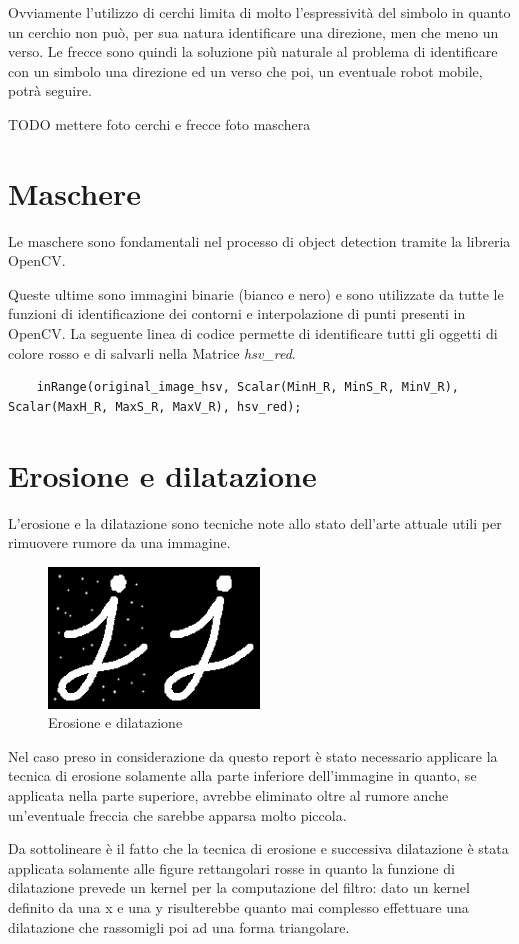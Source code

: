 Ovviamente l'utilizzo di cerchi limita di molto l'espressività del simbolo in quanto un cerchio non può, per sua natura identificare una direzione, men che meno un verso.
Le frecce sono quindi la soluzione più naturale al problema di identificare con un simbolo una direzione ed un verso che poi, un eventuale robot mobile, potrà seguire.

TODO mettere foto cerchi e frecce
foto maschera

\section{Maschere}
Le maschere sono fondamentali nel processo di object detection tramite la libreria OpenCV.

Queste ultime sono immagini binarie (bianco e nero) e sono utilizzate da tutte le funzioni di identificazione dei contorni e interpolazione di punti presenti in OpenCV.
La seguente linea di codice permette di identificare tutti gli oggetti di colore rosso e di salvarli nella Matrice \textit{hsv\_red}.

\begin{lstlisting}
	inRange(original_image_hsv, Scalar(MinH_R, MinS_R, MinV_R), Scalar(MaxH_R, MaxS_R, MaxV_R), hsv_red);
\end{lstlisting}



\section{Erosione e dilatazione}
L'erosione e la dilatazione sono tecniche note allo stato dell'arte attuale utili per rimuovere rumore da una immagine.

\begin{figure}[H]
	\centering
	\includegraphics[width=0.5\textwidth]{Immagini/erosion_dil.png}
	\caption{Erosione e dilatazione}
	\label{fig:erosion_dil}
\end{figure}

Nel caso preso in considerazione da questo report è stato necessario applicare la tecnica di erosione solamente alla parte inferiore dell'immagine in quanto, se applicata nella parte superiore, avrebbe eliminato oltre al rumore anche un'eventuale freccia che sarebbe apparsa molto piccola.

Da sottolineare è il fatto che la tecnica di erosione e successiva dilatazione è stata applicata solamente alle figure rettangolari rosse in quanto la funzione di dilatazione prevede un kernel per la computazione del filtro: dato un kernel definito da una x e una y risulterebbe quanto mai complesso effettuare una dilatazione che rassomigli poi ad una forma triangolare.